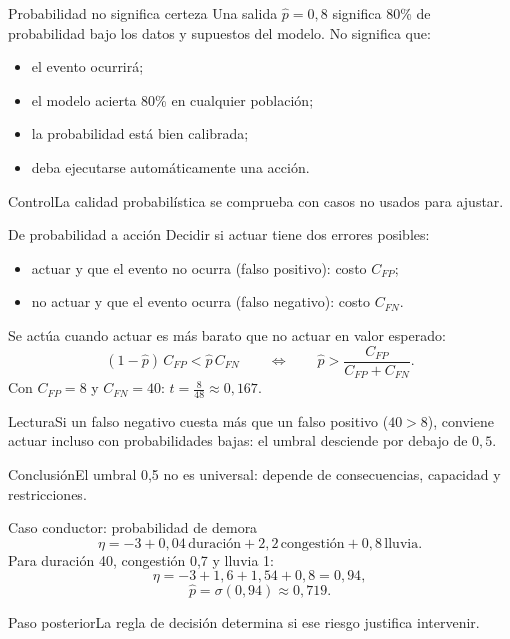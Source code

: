 \documentclass[aspectratio=169,10pt]{beamer}
\begin{document}
\begin{frame}{Probabilidad no significa certeza}
  \small
  Una salida $\widehat p=0{,}8$ significa 80\% de probabilidad bajo los datos y supuestos del modelo. No significa que:
  \begin{itemize}
    \item el evento ocurrirá;
    \item el modelo acierta 80\% en cualquier población;
    \item la probabilidad está bien calibrada;
    \item deba ejecutarse automáticamente una acción.
  \end{itemize}
  \begin{block}{Control}La calidad probabilística se comprueba con casos no usados para ajustar.\end{block}
\end{frame}

\begin{frame}{De probabilidad a acción}
  \small
  Decidir si actuar tiene dos errores posibles:
  \begin{itemize}
    \item actuar y que el evento no ocurra (falso positivo): costo $C_{FP}$;
    \item no actuar y que el evento ocurra (falso negativo): costo $C_{FN}$.
  \end{itemize}
  Se actúa cuando actuar es más barato que no actuar en valor esperado:
  \[(1-\widehat p)\,C_{FP}<\widehat p\,C_{FN}
  \qquad\Longleftrightarrow\qquad
  \widehat p>\frac{C_{FP}}{C_{FP}+C_{FN}}.\]
  Con $C_{FP}=8$ y $C_{FN}=40$: $t=\frac{8}{48}\approx0{,}167$.
  \begin{block}{Lectura}Si un falso negativo cuesta más que un falso positivo ($40>8$), conviene actuar incluso con probabilidades bajas: el umbral desciende por debajo de $0{,}5$.\end{block}
  \begin{alertblock}{Conclusión}El umbral 0,5 no es universal: depende de consecuencias, capacidad y restricciones.\end{alertblock}
\end{frame}

\begin{frame}{Caso conductor: probabilidad de demora}
  \small
  \[\eta=-3+0{,}04\,\text{duración}+2{,}2\,\text{congestión}+0{,}8\,\text{lluvia}.\]
  Para duración 40, congestión 0,7 y lluvia 1:
  \[\eta=-3+1{,}6+1{,}54+0{,}8=0{,}94,\]
  \[\widehat p=\sigma(0{,}94)\approx0{,}719.\]
  \begin{block}{Paso posterior}La regla de decisión determina si ese riesgo justifica intervenir.\end{block}
\end{frame}
\end{document}
